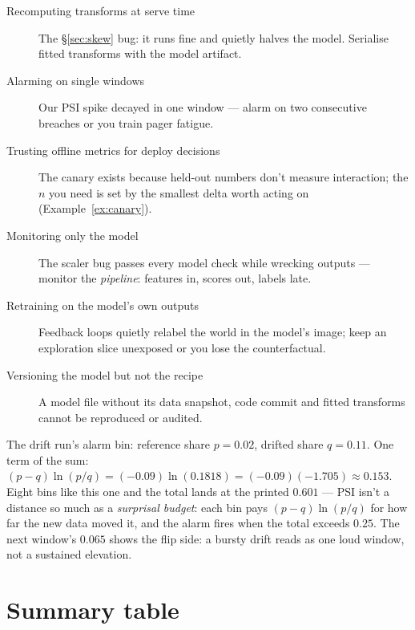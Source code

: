 \begin{description}
\item[Recomputing transforms at serve time] The \S\ref{sec:skew} bug:
it runs fine and quietly halves the model. Serialise fitted
transforms with the model artifact.
\item[Alarming on single windows] Our PSI spike decayed in one window
--- alarm on two consecutive breaches or you train pager fatigue.
\item[Trusting offline metrics for deploy decisions] The canary
exists because held-out numbers don't measure interaction; the $n$
you need is set by the smallest delta worth acting on
(Example~\ref{ex:canary}).
\item[Monitoring only the model] The scaler bug passes every model
check while wrecking outputs --- monitor the \emph{pipeline}:
features in, scores out, labels late.
\item[Retraining on the model's own outputs] Feedback loops quietly
relabel the world in the model's image; keep an exploration slice
unexposed or you lose the counterfactual.
\item[Versioning the model but not the recipe] A model file without
its data snapshot, code commit and fitted transforms cannot be
reproduced or audited.
\end{description}

\begin{example}
\label{ex:psihand}
The drift run's alarm bin: reference share $p{=}0.02$, drifted share
$q{=}0.11$. One term of the sum: $(p-q)\ln(p/q) = (-0.09)\ln(0.1818)
= (-0.09)(-1.705) \approx 0.153$. Eight bins like this one and the
total lands at the printed $0.601$ --- PSI isn't a distance so much as
a \emph{surprisal budget}: each bin pays $(p-q)\ln(p/q)$ for how far
the new data moved it, and the alarm fires when the total exceeds
$0.25$. The next window's $0.065$ shows the flip side: a bursty drift
reads as one loud window, not a sustained elevation.
\end{example}

\section{Summary table}
\label{sec:prodsummary}

